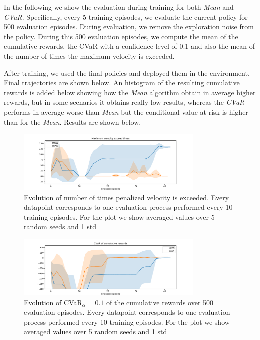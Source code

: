 In the following we show the evaluation during training for both \textit{Mean} and
\textit{CVaR}.
Specifically, every 5 training episodes, we evaluate the current policy for 500 evaluation
episodes.
During evaluation, we remove the exploration noise from the policy.
During this 500 evaluation episodes, we compute the mean of the cumulative rewards,
the CVaR with a confidence level of 0.1 and also the mean of the number of times the 
maximum velocity is exceeded. 

After training, we used the final policies and deployed them in the 
environment. Final trajectories are shown below.
An histogram of the resulting cumulative rewards is added below showing
how the \textit{Mean} algorithm obtain in average higher rewards, but in some scenarios it 
obtains really low results, whereas the \textit{CVaR} performs in average worse than \textit{Mean} 
but the conditional value at risk is higher than for the \textit{Mean}.
Results are shown below.

\begin{figure}[ht]
        \centering
        \includegraphics[width=0.8\textwidth]{images/Car/CVAR/times_exceedvel_withstds.pdf}
        \caption{Evolution of number of times penalized velocity is exceeded.
        Every datapoint corresponds
        to one evaluation process performed every 10 training episodes. For the plot we
        show averaged values over 5 random seeds and 1 std}
        \label{maxveltimes_car}
    
\end{figure}

\begin{figure}[ht]
        \centering
        \includegraphics[width=0.8\textwidth]{images/Car/CVAR/cvar_train_withstds.pdf}
        \caption{Evolution of CVaR$_\alpha=0.1$ of the cumulative rewards over 500 evaluation episodes.
        Every datapoint corresponds
        to one evaluation process performed every 10 training episodes.
        For the plot we
        show averaged values over 5 random seeds and 1 std}
        \label{cvar_car}
    
\end{figure}

